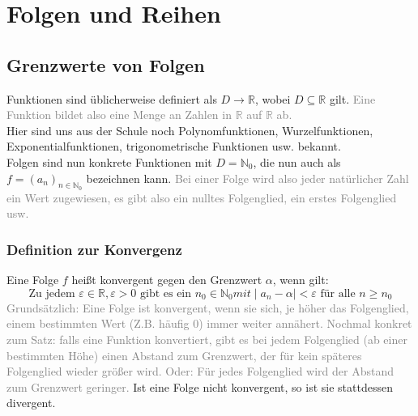 \documentclass{report}
\begin{document}
		\chapter{Folgen und Reihen}
			\section{Grenzwerte von Folgen}
				Funktionen sind üblicherweise definiert als $ D \rightarrow \mathbb{R}$, wobei $D \subseteq \mathbb{R}$ gilt. \textcolor{gray}{Eine Funktion bildet also eine Menge an Zahlen in $\mathbb{R}$ auf $\mathbb{R}$ ab.}\\
				Hier sind uns aus der Schule noch Polynomfunktionen, Wurzelfunktionen, Exponentialfunktionen, trigonometrische Funktionen usw. bekannt.\\
				Folgen sind nun konkrete Funktionen mit $D = \mathbb{N}_0 $, die nun auch als $f = (a_n)_{n\in\mathbb{N}_0}$ bezeichnen kann. \textcolor{gray}{Bei einer Folge wird also jeder natürlicher Zahl ein Wert zugewiesen, es gibt also ein nulltes Folgenglied, ein erstes Folgenglied usw.}
				\subsection{Definition zur Konvergenz}
					Eine Folge $f$ heißt konvergent gegen den Grenzwert $\alpha$, wenn gilt:
					\begin{equation}
						\mbox{Zu jedem } \varepsilon \in \mathbb{R}, \varepsilon > 0 \mbox{ gibt es ein } n_0 \in \mathbb{N}_0 mit \mid a_n - \alpha \mid < \varepsilon \mbox{ für alle } n \geq n_0
					\end{equation}
					\textcolor{gray}{
						Grundsätzlich: Eine Folge ist konvergent, wenn sie sich, je höher das Folgenglied, einem bestimmten Wert (Z.B. häufig 0) immer weiter annähert. Nochmal konkret zum Satz: falls eine Funktion konvertiert, gibt es bei jedem Folgenglied (ab einer bestimmten Höhe) einen Abstand zum Grenzwert, der für kein späteres Folgenglied wieder größer wird. Oder: Für jedes Folgenglied wird der Abstand zum Grenzwert geringer.}
					Ist eine Folge nicht konvergent, so ist sie stattdessen divergent. 
\end{document}
